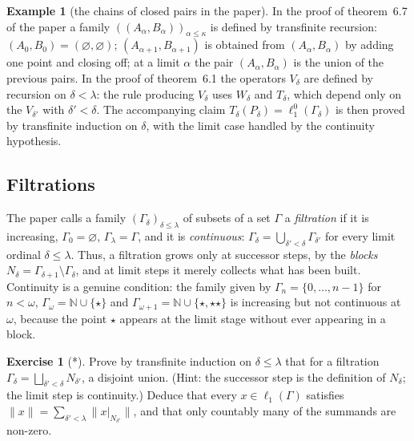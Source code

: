 \documentclass[12pt]{article}
\theoremstyle{definition}
\newtheorem{example}[theorem]{Example}
\newtheorem{exercise}[theorem]{Exercise}
\theoremstyle{remark}
\newcommand{\lo}[1]{\ell_1^0(#1)}
\newcommand{\ellone}[1]{\ell_1(#1)}
\newcommand{\norm}[1]{\lVert #1\rVert}
\newcommand{\NN}{\mathbb{N}}
\begin{document}
\begin{example}[the chains of closed pairs in the paper] In the proof of
    theorem~6.7 of the paper a family ${((A_\alpha,B_\alpha))}_{\alpha\leq\kappa}$
    is defined by transfinite recursion: $(A_0,B_0)=(\varnothing,\varnothing)$;
    $(A_{\alpha+1},B_{\alpha+1})$ is obtained from $(A_\alpha,B_\alpha)$ by
    adding one point and closing off; at a limit $\alpha$ the pair
    $(A_\alpha,B_\alpha)$ is the union of the previous pairs. In the proof of
    theorem~6.1 the operators $V_\delta$ are defined by recursion on
    $\delta<\lambda$: the rule producing $V_\delta$ uses $W_\delta$ and
    $T_\delta$, which depend only on the $V_{\delta'}$ with $\delta'<\delta$.
    The accompanying claim $T_\delta(P_\delta)=\lo{\Gamma_\delta}$ is then
    proved by transfinite induction on $\delta$, with the limit case handled
    by the continuity hypothesis.
\end{example}

\subsection{Filtrations}

The paper calls a family ${(\Gamma_\delta)}_{\delta\leq\lambda}$ of subsets
of a set $\Gamma$ a \emph{filtration} if it is increasing,
$\Gamma_0=\varnothing$, $\Gamma_\lambda=\Gamma$, and it is \emph{continuous}:
$\Gamma_\delta=\bigcup_{\delta'<\delta}\Gamma_{\delta'}$ for every limit
ordinal $\delta\leq\lambda$. Thus, a filtration grows only at successor
steps, by the \emph{blocks} $N_\delta=\Gamma_{\delta+1}\setminus\Gamma_\delta$,
and at limit steps it merely collects what has been built. Continuity is a
genuine condition: the family given by $\Gamma_n=\{0,\ldots,n-1\}$ for
$n<\omega$, $\Gamma_\omega=\NN\cup\{\star\}$ and $\Gamma_{\omega+1}=\NN\cup\{\star,\star\star\}$
is increasing but not continuous at $\omega$, because the point $\star$
appears at the limit stage without ever appearing in a block.

\begin{exercise}[*] Prove by transfinite induction on $\delta\leq\lambda$ that
    for a filtration $\Gamma_\delta=\bigsqcup_{\delta'<\delta}N_{\delta'}$,
    a disjoint union. (Hint: the successor step is the definition of
    $N_\delta$; the limit step is continuity.) Deduce that every $x\in\ellone{\Gamma}$
    satisfies $\norm{x}=\sum_{\delta'<\lambda}\norm{x|_{N_{\delta'}}}$, and
    that only countably many of the summands are non-zero.
\end{exercise}
\end{document}
